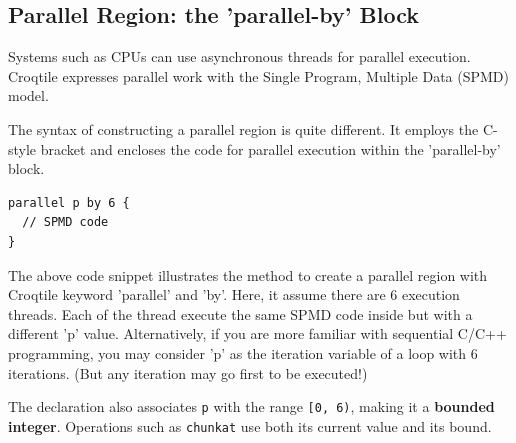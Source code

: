 \subsection*{Parallel Region: the 'parallel-by' Block}

Systems such as CPUs can use asynchronous threads for parallel execution. Croqtile expresses parallel work with the Single Program, Multiple Data (SPMD) model.

The syntax of constructing a parallel region is quite different. It employs the C-style bracket and encloses the code for parallel execution within the 'parallel-by' block.

\begin{lstlisting}[language=croqtile,caption={Parallel Region: the parallel-by Block}]
parallel p by 6 {
  // SPMD code
}
\end{lstlisting}

The above code snippet illustrates the method to create a parallel region with Croqtile keyword 'parallel' and 'by'. Here, it assume there are 6 execution threads. Each of the thread execute the same SPMD code inside but with a different 'p' value. Alternatively, if you are more familiar with sequential C/C++ programming, you may consider 'p' as the iteration variable of a loop with 6 iterations. (But any iteration may go first to be executed!)

The declaration also associates \texttt{p} with the range \texttt{[0, 6)}, making it a \textbf{bounded integer}. Operations such as \texttt{chunkat} use both its current value and its bound.
